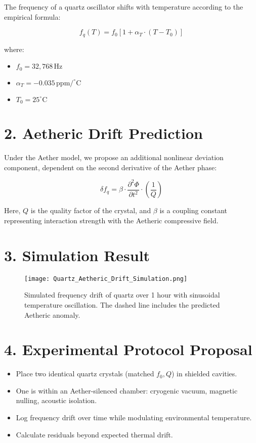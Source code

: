 \documentclass[12pt]{book}
\begin{document}
The frequency of a quartz oscillator shifts with temperature according to the empirical formula:

\[
f_q(T) = f_0 \left[ 1 + \alpha_T \cdot (T - T_0) \right]
\]

where:
\begin{itemize}
    \item \( f_0 = 32{,}768 \, \text{Hz} \)
    \item \( \alpha_T = -0.035 \, \text{ppm}/^\circ\text{C} \)
    \item \( T_0 = 25^\circ\text{C} \)
\end{itemize}

\section*{2. Aetheric Drift Prediction}

Under the Aether model, we propose an additional nonlinear deviation component, dependent on the second derivative of the Aether phase:

\[
\delta f_q = \beta \cdot \frac{\partial^2 \Phi}{\partial t^2} \cdot \left( \frac{1}{Q} \right)
\]

Here, \( Q \) is the quality factor of the crystal, and \( \beta \) is a coupling constant representing interaction strength with the Aetheric compressive field.

\section*{3. Simulation Result}

\begin{figure}[h!]
\centering
\texttt{[image: Quartz\_Aetheric\_Drift\_Simulation.png]}
\caption{Simulated frequency drift of quartz over 1 hour with sinusoidal temperature oscillation. The dashed line includes the predicted Aetheric anomaly.}
\end{figure}

\section*{4. Experimental Protocol Proposal}

\begin{itemize}
    \item Place two identical quartz crystals (matched \( f_0, Q \)) in shielded cavities.
    \item One is within an Aether-silenced chamber: cryogenic vacuum, magnetic nulling, acoustic isolation.
    \item Log frequency drift over time while modulating environmental temperature.
    \item Calculate residuals beyond expected thermal drift.
\end{itemize}
\end{document}
